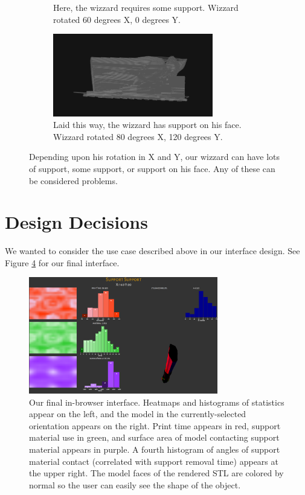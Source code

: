 \documentclass{sigchi}
\begin{document}
\begin{figure}
\begin{subfigure}[b]{0.3\textwidth}
                \caption{Here, the wizzard requires some support.  Wizzard rotated 60 degrees X, 0 degrees Y.}
                \label{fig:some}
        \end{subfigure}
        \begin{subfigure}[b]{0.3\textwidth}
                \includegraphics[width=2.75in]{images/wizzard-facesupport}
                \caption{Laid this way, the wizzard has support on his face.  Wizzard rotated 80 degrees X, 120 degrees Y.}
                \label{fig:face}
        \end{subfigure}
        \caption{Depending upon his rotation in X and Y, our wizzard can have lots of support, some support, or support on his face.  Any of these can be considered problems.}\label{fig:rotations}
\end{figure}

\section{Design Decisions}
We wanted to consider the use case described above in our interface design.  See Figure \ref{fig:full} for our final interface.

\begin{figure}
\centering
\includegraphics[width=3.25in]{images/fullInterface.png}
\caption{Our final in-browser interface.  Heatmaps and histograms of statistics appear on the left, and the model in the currently-selected orientation appears on the right.  Print time appears in red, support material use in green, and surface area of model contacting support material appears in purple.  A fourth histogram of angles of support material contact (correlated with support removal time) appears at the upper right.  The model faces of the rendered STL are colored by normal so the user can easily see the shape of the object.}
\label{fig:full}
\end{figure}
\end{document}
